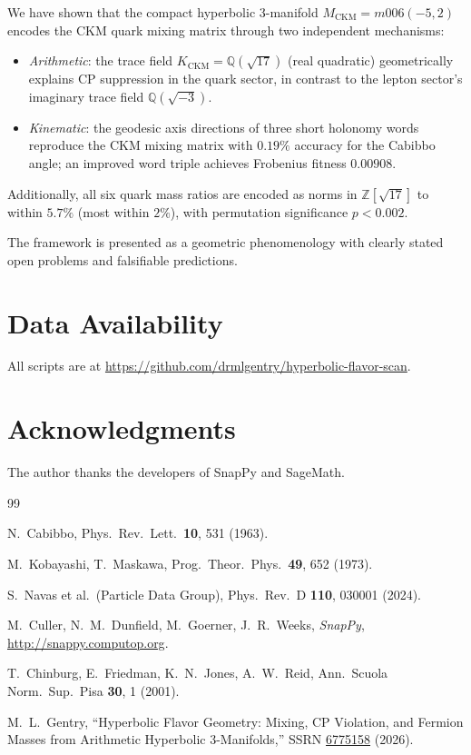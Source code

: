\documentclass[11pt,a4paper]{article}
\theoremstyle{definition}
\theoremstyle{remark}
\newcommand{\MCKM}{M_{\mathrm{CKM}}}
\newcommand{\KCKM}{K_{\mathrm{CKM}}}
\newcommand{\Zsev}{\mathbb{Z}[\sqrt{17}]}
\begin{document}
We have shown that the compact hyperbolic 3-manifold
$\MCKM = m006(-5,2)$ encodes the CKM quark mixing matrix through
two independent mechanisms:
\begin{itemize}
\item \emph{Arithmetic}: the trace field $\KCKM=\mathbb{Q}(\sqrt{17})$
  (real quadratic) geometrically explains CP suppression in the quark
  sector, in contrast to the lepton sector's imaginary trace field
  $\mathbb{Q}(\sqrt{-3})$.
\item \emph{Kinematic}: the geodesic axis directions of three short
  holonomy words reproduce the CKM mixing matrix with $0.19\%$
  accuracy for the Cabibbo angle; an improved word triple achieves
  Frobenius fitness $0.00908$.
\end{itemize}
Additionally, all six quark mass ratios are encoded as norms in
$\Zsev$ to within $5.7\%$ (most within $2\%$), with permutation
significance $p<0.002$.

The framework is presented as a geometric phenomenology with clearly
stated open problems and falsifiable predictions.

\section*{Data Availability}

All scripts are at
\url{https://github.com/drmlgentry/hyperbolic-flavor-scan}.

\section*{Acknowledgments}

The author thanks the developers of SnapPy and SageMath.

\begin{thebibliography}{99}

N.~Cabibbo, Phys.\ Rev.\ Lett.\ \textbf{10}, 531 (1963).

M.~Kobayashi, T.~Maskawa,
Prog.\ Theor.\ Phys.\ \textbf{49}, 652 (1973).

S.~Navas et al.\ (Particle Data Group),
Phys.\ Rev.\ D \textbf{110}, 030001 (2024).

M.~Culler, N.~M.~Dunfield, M.~Goerner, J.~R.~Weeks,
\textit{SnapPy}, \url{http://snappy.computop.org}.

T.~Chinburg, E.~Friedman, K.~N.~Jones, A.~W.~Reid,
Ann.\ Scuola Norm.\ Sup.\ Pisa \textbf{30}, 1 (2001).

M.~L.~Gentry,
``Hyperbolic Flavor Geometry: Mixing, CP Violation, and Fermion
Masses from Arithmetic Hyperbolic 3-Manifolds,''
SSRN \href{https://doi.org/10.2139/ssrn.6775158}{6775158} (2026).

\end{thebibliography}
\end{document}
